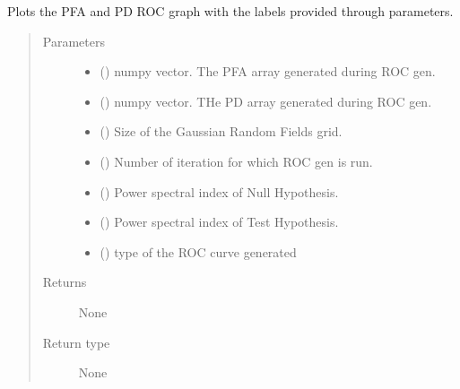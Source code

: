 \documentclass[letterpaper,10pt,english]{sphinxmanual}
\begin{document}

\begin{fulllineitems}
\label{\detokenize{utilities:utilities.plotROC}}
\sphinxAtStartPar
Plots the PFA and PD ROC graph with the labels provided through parameters.
\begin{quote}\begin{description}
\item[{Parameters}] \leavevmode\begin{itemize}
\item {} 
\sphinxAtStartPar
{} () \textendash{} numpy vector. The PFA array generated during ROC gen.

\item {} 
\sphinxAtStartPar
{} () \textendash{} numpy vector. THe PD array generated during ROC gen.

\item {} 
\sphinxAtStartPar
{} () \textendash{} Size of the Gaussian Random Fields grid.

\item {} 
\sphinxAtStartPar
{} () \textendash{} Number of iteration for which ROC gen is run.

\item {} 
\sphinxAtStartPar
{} () \textendash{} Power spectral index of Null Hypothesis.

\item {} 
\sphinxAtStartPar
{} () \textendash{} Power spectral index of Test Hypothesis.

\item {} 
\sphinxAtStartPar
{} () \textendash{} type of the ROC curve generated

\end{itemize}

\item[{Returns}] \leavevmode
\sphinxAtStartPar
None

\item[{Return type}] \leavevmode
\sphinxAtStartPar
None

\end{description}\end{quote}

\end{fulllineitems}
\end{document}
